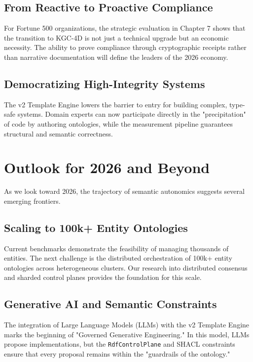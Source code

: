 \subsection{From Reactive to Proactive Compliance}

For Fortune 500 organizations, the strategic evaluation in Chapter 7 shows that the transition to KGC-4D is not just a technical upgrade but an economic necessity. The ability to prove compliance through cryptographic receipts rather than narrative documentation will define the leaders of the 2026 economy.

\subsection{Democratizing High-Integrity Systems}

The v2 Template Engine lowers the barrier to entry for building complex, type-safe systems. Domain experts can now participate directly in the "precipitation" of code by authoring ontologies, while the measurement pipeline guarantees structural and semantic correctness.

\section{Outlook for 2026 and Beyond}

As we look toward 2026, the trajectory of semantic autonomics suggests several emerging frontiers.

\subsection{Scaling to 100k+ Entity Ontologies}

Current benchmarks demonstrate the feasibility of managing thousands of entities. The next challenge is the distributed orchestration of 100k+ entity ontologies across heterogeneous clusters. Our research into distributed consensus and sharded control planes provides the foundation for this scale.

\subsection{Generative AI and Semantic Constraints}

The integration of Large Language Models (LLMs) with the v2 Template Engine marks the beginning of "Governed Generative Engineering." In this model, LLMs propose implementations, but the \texttt{RdfControlPlane} and SHACL constraints ensure that every proposal remains within the "guardrails of the ontology."

